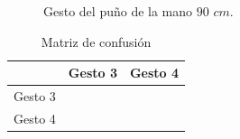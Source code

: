 \begin{figure}[h!]
\caption{Gesto del puño de la mano $90$ $cm$.} \label{fig:G2IM90}
\end{figure}

\begin{table}[h!] 
\begin{center}
\begin{tabular}{ r || c | c |} 
 
        & Gesto 3 & Gesto 4 \\ \hline \hline  
Gesto 3 &      &      \\ \hline  
Gesto 4 &      &       \\   

\end{tabular}
\end{center} 
\caption{Matriz de confusión}
\end{table}


